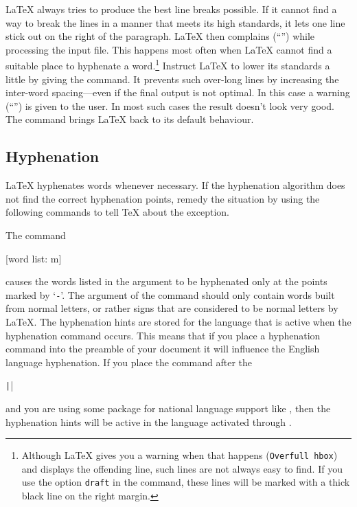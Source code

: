 \LaTeX{} always tries to produce the best line breaks possible. If it
cannot find a way to break the lines in a manner that meets its high
standards, it lets one line stick out on the right of the paragraph.
\LaTeX{} then complains (``'') while processing the
input file. This happens most often when \LaTeX{} cannot find a
suitable place to hyphenate a word.\footnote{Although \LaTeX{} gives
  you a warning when that happens (\texttt{Overfull \bs{}hbox}) and displays the
  offending line, such lines are not always easy to find. If you use
  the option \texttt{draft} in the  command, these
  lines will be marked with a thick black line on the right margin.}
Instruct \LaTeX{} to lower its standards a little by giving
the  command. It prevents such over-long lines by
increasing the inter-word spacing---even if the final output is not
optimal.  In this case a warning (``'') is given to
the user.  In most such cases the result doesn't look very good. The
command  brings \LaTeX{} back to its default behaviour.

\subsection{Hyphenation}\label{hyph}

\LaTeX{} hyphenates words whenever necessary. If the hyphenation
algorithm does not find the correct hyphenation points,
remedy the situation by using the following commands to tell \TeX{}
about the exception.

The command
\begin{lscommand}
  [word list: m]
\end{lscommand}
causes the words listed in the argument to be hyphenated only at the points
marked by \enquote*{\texttt{-}}.  The argument of the command should only contain
words built from normal letters, or rather signs that are considered to be
normal letters by \LaTeX{}. The hyphenation hints are stored for the language
that is active when the hyphenation command occurs. This means that if you
place a hyphenation command into the preamble of your document it will
influence the English language hyphenation. If you place the command after the
\begin{chktexignore}
  \texttt||
\end{chktexignore}
and you are using some package for national language
support like , then the hyphenation hints will be active in
the language activated through .

